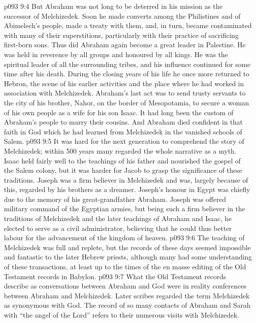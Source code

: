 \vs p093 9:4 But Abraham was not long to be deterred in his mission as the successor of Melchizedek. Soon he made converts among the Philistines and of Abimelech’s people, made a treaty with them, and, in turn, became contaminated with many of their superstitions, particularly with their practice of sacrificing first\hyp{}born sons. Thus did Abraham again become a great leader in Palestine. He was held in reverence by all groups and honoured by all kings. He was the spiritual leader of all the surrounding tribes, and his influence continued for some time after his death. During the closing years of his life he once more returned to Hebron, the scene of his earlier activities and the place where he had worked in association with Melchizedek. Abraham’s last act was to send trusty servants to the city of his brother, Nahor, on the border of Mesopotamia, to secure a woman of his own people as a wife for his son Isaac. It had long been the custom of Abraham’s people to marry their cousins. And Abraham died confident in that faith in God which he had learned from Melchizedek in the vanished schools of Salem.
\vs p093 9:5 \pc It was hard for the next generation to comprehend the story of Melchizedek; within 500 years many regarded the whole narrative as a myth. Isaac held fairly well to the teachings of his father and nourished the gospel of the Salem colony, but it was harder for Jacob to grasp the significance of these traditions. Joseph was a firm believer in Melchizedek and was, largely because of this, regarded by his brothers as a dreamer. Joseph’s honour in Egypt was chiefly due to the memory of his great\hyp{}grandfather Abraham. Joseph was offered military command of the Egyptian armies, but being such a firm believer in the traditions of Melchizedek and the later teachings of Abraham and Isaac, he elected to serve as a civil administrator, believing that he could thus better labour for the advancement of the kingdom of heaven.
\vs p093 9:6 The teaching of Melchizedek was full and replete, but the records of these days seemed impossible and fantastic to the later Hebrew priests, although many had some understanding of these transactions, at least up to the times of the en masse editing of the Old Testament records in Babylon.
\vs p093 9:7 What the Old Testament records describe as conversations between Abraham and God were in reality conferences between Abraham and Melchizedek. Later scribes regarded the term Melchizedek as synonymous with God. The record of so many contacts of Abraham and Sarah with “the angel of the Lord” refers to their numerous visits with Melchizedek.
